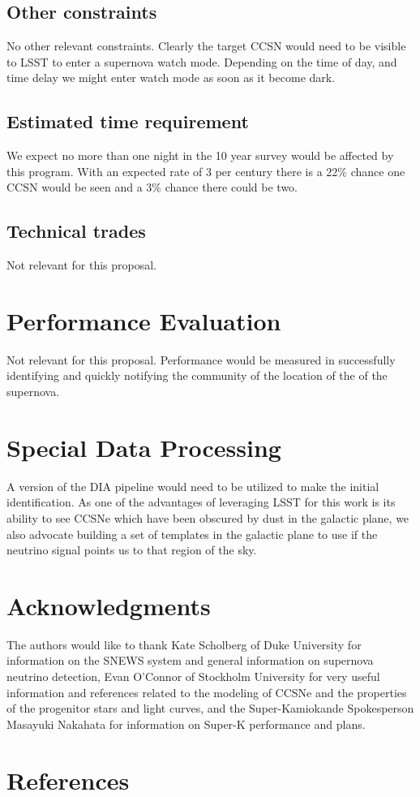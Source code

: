 \documentclass[12pt, letterpaper]{article}
\begin{document}
\subsection{Other constraints}

No other relevant constraints.  Clearly the target CCSN would need to be
visible to LSST to enter a supernova watch mode.  Depending on the
time of day, and time delay we might enter watch mode as soon as it
become dark.

\subsection{Estimated time requirement}

We expect no more than one night in the 10 year survey would be
affected by this program. With an expected rate of 3 per century there
is a 22\% chance one CCSN would be seen and a 3\% chance there could
be two.

\subsection{Technical trades}

Not relevant for this proposal.

\section{Performance Evaluation}

Not relevant for this proposal.  Performance would be measured in successfully
identifying and quickly notifying the community of the location of the
of the supernova.

\section{Special Data Processing}

A version of the DIA pipeline would need to be utilized to make the
initial identification.  As one of the advantages of leveraging LSST
for this work is its ability to see CCSNe which have been obscured by
dust in the galactic plane, we also advocate building a set of
templates in the galactic plane to use if the neutrino signal points
us to that region of the sky.

\section{Acknowledgments}

The authors would like to thank Kate Scholberg of Duke University for
information on the SNEWS system and general information on supernova
neutrino detection, Evan O'Connor of Stockholm University for
very useful information and references related to the modeling of CCSNe
and the properties of the progenitor stars and light curves, and the
Super-Kamiokande Spokesperson Masayuki Nakahata for information on
Super-K performance and plans.

\section{References}

 

\end{document}
